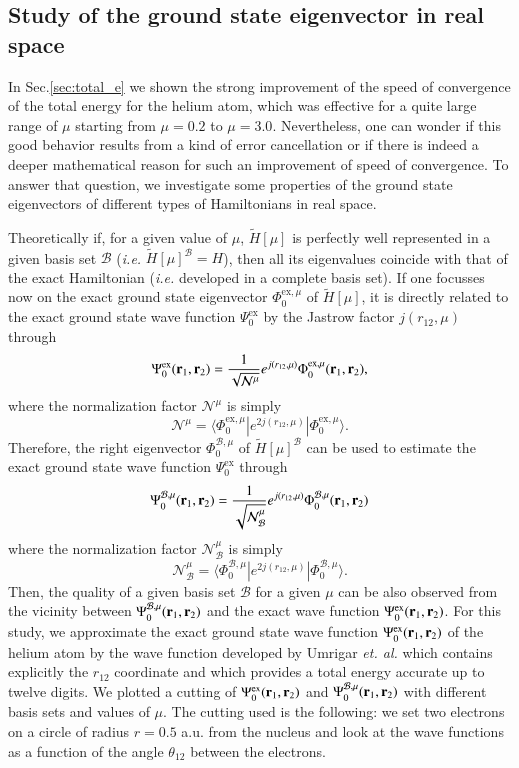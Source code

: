 \documentclass[aip,jcp,reprint,noshowkeys,superscriptaddress]{revtex4-1}
\newcommand{\matelem}[3]{\langle #1 | #2 | #3 \rangle}
\newcommand{\br}[0]{{\bf {r}}}
\newcommand{\psiex}[0]{\Psi^{\text{ex}}_0}
\newcommand{\phimu}[0]{\Phi^{\text{ex},\mu}_0}
\newcommand{\phimub}[0]{\Phi^{\mathcal{B},\mu}_0}
\newcommand{\psimub}[0]{\Psi^{\mathcal{B},\mu}_0}
\newcommand{\basis}[0]{\mathcal{B}}
\begin{document}
\subsection{Study of the ground state eigenvector in real space}
In Sec.\ref{sec:total_e} we shown the strong improvement of the speed of convergence of the total energy for the helium atom, which was effective for a quite large range of $\mu$ starting from $\mu=0.2$ to $\mu=3.0$. 
Nevertheless, one can wonder if this good behavior results from a kind of error cancellation or if there is indeed a deeper mathematical reason for such an improvement of speed of convergence. 
To answer that question, we investigate some properties of the ground state eigenvectors of different types of Hamiltonians in real space. 

Theoretically if, for a given value of $\mu$, $\tilde{H}[\mu]$ is perfectly well represented in a given basis set $\mathcal{B}$ (\textit{i.e.} $\tilde{H}[\mu]^{\basis} = H$), then all its eigenvalues coincide with that of the exact Hamiltonian (\textit{i.e.} developed in a complete basis set). If one focusses now on the exact ground state eigenvector $\phimu$ of $\tilde{H}[\mu]$, it is directly related to the exact ground state wave function $\psiex$ by the Jastrow factor $j(r_{12},\mu)$ through 
\begin{equation}
 \psiex(\br{}_1,\br{}_2) =  \frac{1}{\sqrt{\mathcal{N}^{\mu}}} e^{j(r_{12},\mu)} \phimu(\br{}_1,\br{}_2), 
\end{equation}
where the normalization factor $\mathcal{N}^{\mu}$ is simply 
\begin{equation}
  \mathcal{N}^{\mu} = \matelem{\phimu}{e^{2 j(r_{12},\mu)}}{\phimu}.
\end{equation}
Therefore, the right eigenvector $\phimub$ of $\tilde{H}[\mu]^{\basis}$ can be used to estimate the exact ground state wave function $\psiex$ through 
\begin{equation}
 \psimub(\br{}_1,\br{}_2) = \frac{1}{\sqrt{\mathcal{N}_{\basis}^{\mu}}}e^{j(r_{12},\mu)}\phimub(\br{}_1,\br{}_2)
\end{equation}
where the normalization factor $\mathcal{N}_{\basis}^{\mu}$ is simply
\begin{equation}
  \mathcal{N}_{\basis}^{\mu} = \matelem{\phimub}{e^{2 j(r_{12},\mu)}}{\phimub}.
\end{equation}
Then, the quality of a given basis set $\basis$ for a given $\mu$ can be also observed from the vicinity between $\psimub(\br{}_1,\br{}_2)$ and the exact wave function $\psiex(\br{}_1,\br{}_2)$. 
For this study, we approximate the exact ground state wave function $\psiex(\br{}_1,\br{}_2)$ of the helium atom by the wave function developed by Umrigar \textit{et. al.}\cite{UmrGon-PRA-94} which contains explicitly the $r_{12}$ coordinate and which provides a total energy accurate up to twelve digits.  
We plotted a cutting of $\psiex(\br{}_1,\br{}_2)$ and  $\psimub(\br{}_1,\br{}_2) $ with different basis sets and values of $\mu$. The cutting used is the following: we set two electrons on a circle of radius $r=0.5$ a.u. from the nucleus and look at the wave functions as a function of the angle $\theta_{12}$ between the electrons. 
\end{document}
